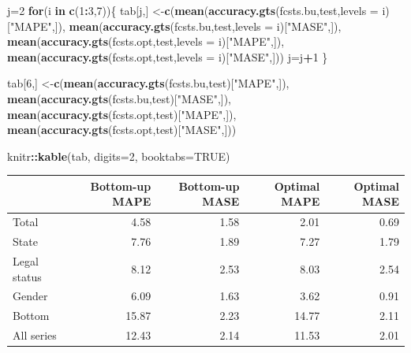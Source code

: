 \documentclass[]{book}
\newenvironment{Shaded}{\begin{snugshade}}{\end{snugshade}}
\newcommand{\ControlFlowTok}[1]{\textcolor[rgb]{0.13,0.29,0.53}{\textbf{#1}}}
\newcommand{\DataTypeTok}[1]{\textcolor[rgb]{0.13,0.29,0.53}{#1}}
\newcommand{\DecValTok}[1]{\textcolor[rgb]{0.00,0.00,0.81}{#1}}
\newcommand{\KeywordTok}[1]{\textcolor[rgb]{0.13,0.29,0.53}{\textbf{#1}}}
\newcommand{\NormalTok}[1]{#1}
\newcommand{\OperatorTok}[1]{\textcolor[rgb]{0.81,0.36,0.00}{\textbf{#1}}}
\newcommand{\OtherTok}[1]{\textcolor[rgb]{0.56,0.35,0.01}{#1}}
\newcommand{\StringTok}[1]{\textcolor[rgb]{0.31,0.60,0.02}{#1}}
\begin{document}
\begin{Shaded}
\begin{Highlighting}[]
\NormalTok{j=}\DecValTok{2}
\ControlFlowTok{for}\NormalTok{(i }\ControlFlowTok{in} \KeywordTok{c}\NormalTok{(}\DecValTok{1}\OperatorTok{:}\DecValTok{3}\NormalTok{,}\DecValTok{7}\NormalTok{))\{}
\NormalTok{tab[j,] <-}\KeywordTok{c}\NormalTok{(}\KeywordTok{mean}\NormalTok{(}\KeywordTok{accuracy.gts}\NormalTok{(fcsts.bu,test,}\DataTypeTok{levels =}\NormalTok{ i)[}\StringTok{"MAPE"}\NormalTok{,]),}
            \KeywordTok{mean}\NormalTok{(}\KeywordTok{accuracy.gts}\NormalTok{(fcsts.bu,test,}\DataTypeTok{levels =}\NormalTok{ i)[}\StringTok{"MASE"}\NormalTok{,]),}
            \KeywordTok{mean}\NormalTok{(}\KeywordTok{accuracy.gts}\NormalTok{(fcsts.opt,test,}\DataTypeTok{levels =}\NormalTok{ i)[}\StringTok{"MAPE"}\NormalTok{,]),}
            \KeywordTok{mean}\NormalTok{(}\KeywordTok{accuracy.gts}\NormalTok{(fcsts.opt,test,}\DataTypeTok{levels =}\NormalTok{ i)[}\StringTok{"MASE"}\NormalTok{,]))}
\NormalTok{j=j}\OperatorTok{+}\DecValTok{1}
\NormalTok{\}}

\NormalTok{tab[}\DecValTok{6}\NormalTok{,] <-}\KeywordTok{c}\NormalTok{(}\KeywordTok{mean}\NormalTok{(}\KeywordTok{accuracy.gts}\NormalTok{(fcsts.bu,test)[}\StringTok{"MAPE"}\NormalTok{,]),}
            \KeywordTok{mean}\NormalTok{(}\KeywordTok{accuracy.gts}\NormalTok{(fcsts.bu,test)[}\StringTok{"MASE"}\NormalTok{,]),}
            \KeywordTok{mean}\NormalTok{(}\KeywordTok{accuracy.gts}\NormalTok{(fcsts.opt,test)[}\StringTok{"MAPE"}\NormalTok{,]),}
            \KeywordTok{mean}\NormalTok{(}\KeywordTok{accuracy.gts}\NormalTok{(fcsts.opt,test)[}\StringTok{"MASE"}\NormalTok{,]))}

\NormalTok{knitr}\OperatorTok{::}\KeywordTok{kable}\NormalTok{(tab, }\DataTypeTok{digits=}\DecValTok{2}\NormalTok{, }\DataTypeTok{booktabs=}\OtherTok{TRUE}\NormalTok{)}
\end{Highlighting}
\end{Shaded}

\begin{tabular}{lrrrr}
\toprule
  & Bottom-up MAPE & Bottom-up MASE & Optimal MAPE & Optimal MASE\\
\midrule
Total & 4.58 & 1.58 & 2.01 & 0.69\\
State & 7.76 & 1.89 & 7.27 & 1.79\\
Legal status & 8.12 & 2.53 & 8.03 & 2.54\\
Gender & 6.09 & 1.63 & 3.62 & 0.91\\
Bottom & 15.87 & 2.23 & 14.77 & 2.11\\
\addlinespace
All series & 12.43 & 2.14 & 11.53 & 2.01\\
\bottomrule
\end{tabular}
\end{document}
